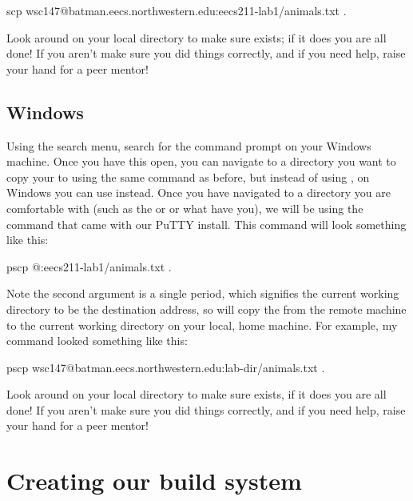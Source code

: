 \documentclass{tufte-handout}
\begin{document}
\begin{CmdLine}
  \prompt scp wsc147@batman.eecs.northwestern.edu:eecs211-lab1/animals.txt .
\end{CmdLine}

Look around on your local directory to make sure 
exists; if it does you are all done!  If you aren't make sure you did
things correctly, and if you need help, raise your hand for a peer
mentor!

\subsection{Windows}

Using the search menu, search for the command prompt on your Windows
machine.  Once you have this open, you can navigate to a directory you
want to copy your  to using the same 
command as before, but instead of using , on Windows you
can use  instead. Once you have navigated to a directory
you are comfortable with (such as the  or
 or what have you), we will be using the
command that came with our PuTTY install.  This command will look
something like this:

\begin{CmdLine}
  \prompt pscp @:eecs211-lab1/animals.txt .
\end{CmdLine}

\noindent
Note the second argument is a single period, which signifies the current
working directory to be the destination address, so  will copy the
 from the remote machine to the current working
directory on your local, home machine. For example, my  command
looked something like this:

\begin{CmdLine}
  \prompt pscp wsc147@batman.eecs.northwestern.edu:lab-dir/animals.txt .
\end{CmdLine}

Look around on your local directory to make sure 
exists, if it does you are all done! If you aren't make sure you did
things correctly, and if you need help, raise your hand for a peer
mentor!

\section{Creating our build system}
\end{document}
